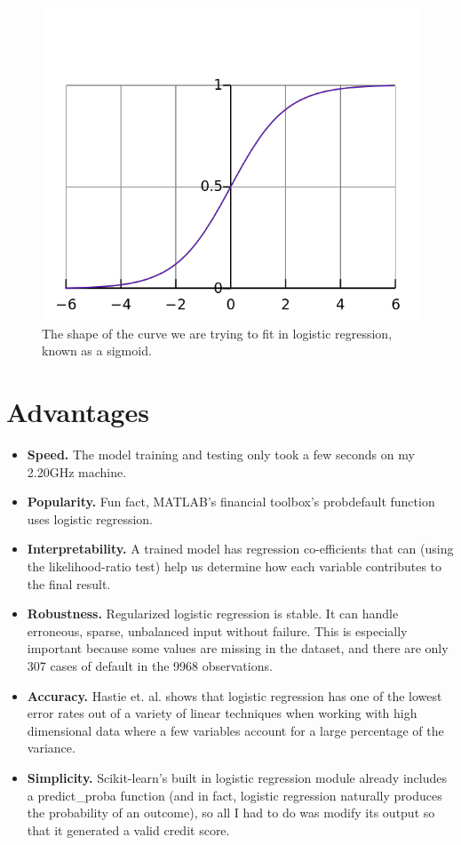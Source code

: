 \documentclass[twocolumn]{article}
\begin{document}
\begin{figure}[h]
	\centering
	\includegraphics[width=\linewidth]{Logistic-curve.png}
	\caption{The shape of the curve we are trying to fit in logistic regression, known as a sigmoid.}
\end{figure}
 
\section*{Advantages}

\begin{itemize}
	\item \textbf{Speed.} The model training and testing only took a few seconds on my 2.20GHz machine. 
	\item \textbf{Popularity.} Fun fact, MATLAB's financial toolbox's probdefault function uses logistic regression.
	\item \textbf{Interpretability.} A trained model has regression co-efficients that can (using the likelihood-ratio test) help us determine how each variable contributes to the final result.
	\item \textbf{Robustness.} Regularized logistic regression is stable. It can handle erroneous, sparse, unbalanced input without failure. This is especially important because some values are missing in the dataset, and there are only 307 cases of default in the 9968 observations.
	\item \textbf{Accuracy.} Hastie et. al. shows that logistic regression has one of the lowest error rates out of a variety of linear techniques when working with high dimensional data where a few variables account for a large percentage of the variance. 
	\item \textbf{Simplicity.} Scikit-learn's built in logistic regression module already includes a predict\_proba function (and in fact, logistic regression naturally produces the probability of an outcome), so all I had to do was modify its output so that it generated a valid credit score. 
\end{itemize}
\end{document}
